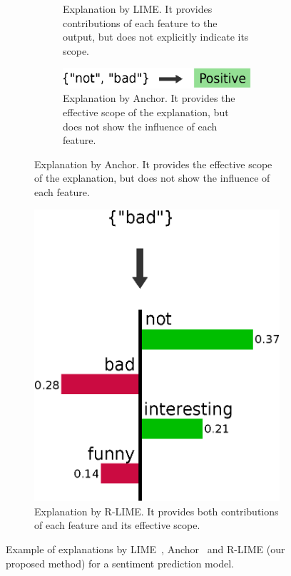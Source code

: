 \documentclass[runningheads]{llncs}
\begin{document}
{\begin{figure}[tbp]
\begin{subfigure}[t]{0.45\textwidth}
\begin{subfigure}[t]{\textwidth}
      \caption{%
        Explanation by LIME\@.
        It provides contributions of each feature to the output,
        but does not explicitly indicate its scope.
      }\label{fig:example-lime}
      \vspace{0.4cm}
    \end{subfigure}
    \begin{subfigure}[t]{\textwidth}
      \centering
      \includegraphics[scale=\scale]{example-anchor}
      \caption{%
        Explanation by Anchor.
        It provides the effective scope of the explanation,
        but does not show the influence of each feature.
      }\label{fig:example-anchor}
    \end{subfigure}
  \end{subfigure}
  \hspace{0.3cm}
  \begin{subfigure}[t]{0.45\textwidth}
    \centering
    \vspace{-2.24cm}
    \includegraphics[scale=\scale]{example-rlime}
    \caption{%
      Explanation by R-LIME\@.
      It provides both contributions of each feature and
      its effective scope.
    }\label{fig:example-rlime}
  \end{subfigure}
  \caption[Example of explanations by LIME, Anchor and R-LIME]{%
    Example of explanations by LIME~\cite{ribeiro2016why},
    Anchor~\cite{ribeiro2018anchors} and R-LIME (our proposed method)
    for a sentiment prediction model.
  }\label{fig:example}
\end{figure}

}
\end{document}

